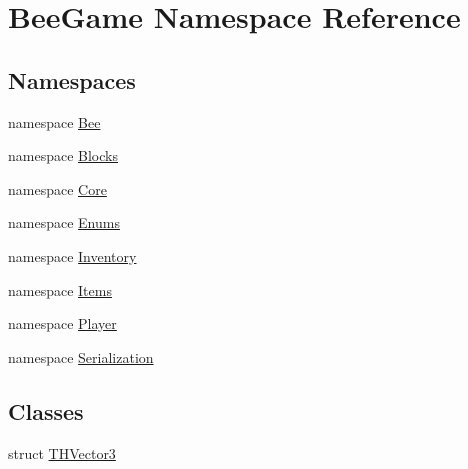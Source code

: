 \hypertarget{namespace_bee_game}{}\section{Bee\+Game Namespace Reference}
\label{namespace_bee_game}
\subsection*{Namespaces}
\begin{DoxyCompactItemize}
\item 
namespace \hyperlink{namespace_bee_game_1_1_bee}{Bee}
\item 
namespace \hyperlink{namespace_bee_game_1_1_blocks}{Blocks}
\item 
namespace \hyperlink{namespace_bee_game_1_1_core}{Core}
\item 
namespace \hyperlink{namespace_bee_game_1_1_enums}{Enums}
\item 
namespace \hyperlink{namespace_bee_game_1_1_inventory}{Inventory}
\item 
namespace \hyperlink{namespace_bee_game_1_1_items}{Items}
\item 
namespace \hyperlink{namespace_bee_game_1_1_player}{Player}
\item 
namespace \hyperlink{namespace_bee_game_1_1_serialization}{Serialization}
\end{DoxyCompactItemize}
\subsection*{Classes}
\begin{DoxyCompactItemize}
\item 
struct \hyperlink{struct_bee_game_1_1_t_h_vector3}{T\+H\+Vector3}
\end{DoxyCompactItemize}
